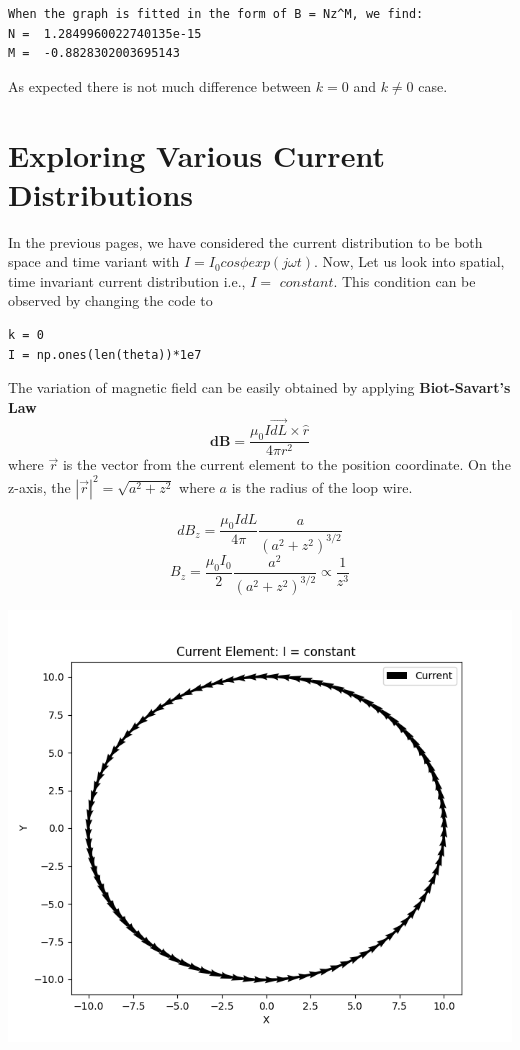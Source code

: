 \documentclass[12pt, a4paper]{report}
\begin{document}
\begin{verbatim}
When the graph is fitted in the form of B = Nz^M, we find:
N =  1.2849960022740135e-15
M =  -0.8828302003695143
\end{verbatim}

As expected there is not much difference between $k = 0$ and $k \neq 0$ case.

\section*{Exploring Various Current Distributions}
In the previous pages, we have considered the current distribution to be both space and time variant with $I = I_0cos\phi exp(j\omega t)$. Now, Let us look into spatial, time invariant current distribution i.e., $I =$ $constant$. This condition can be observed by changing the code to
\begin{verbatim}
k = 0
I = np.ones(len(theta))*1e7
\end{verbatim}

The variation of magnetic field can be easily obtained by applying \textbf{Biot-Savart's Law}
\begin{equation*}
\mathbf{dB} = \frac{\mu_0 I \vec{dL} \times \hat{r}}{4\pi r^2}
\end{equation*}
where $\vec{r}$ is the vector from the current element to the position coordinate. On the z-axis, the $|\vec{r}|^2 = \sqrt{a^2 + z^2}$ where $a$ is the radius of the loop wire.
\clearpage

\begin{equation*}
dB_z = \frac{\mu_0 IdL}{4\pi}\frac{a}{(a^2 + z^2)^{3/2}}
\end{equation*}
\begin{equation*}
B_z = \frac{\mu_0 I_0}{2}\frac{a^2}{(a^2 + z^2)^{3/2}} \propto \frac{1}{z^3}
\end{equation*}

\begin{center}
	\includegraphics[scale=0.60]{Figure_15png.png} 
	\label{fig:rawdata}
\end{center}
\end{document}
